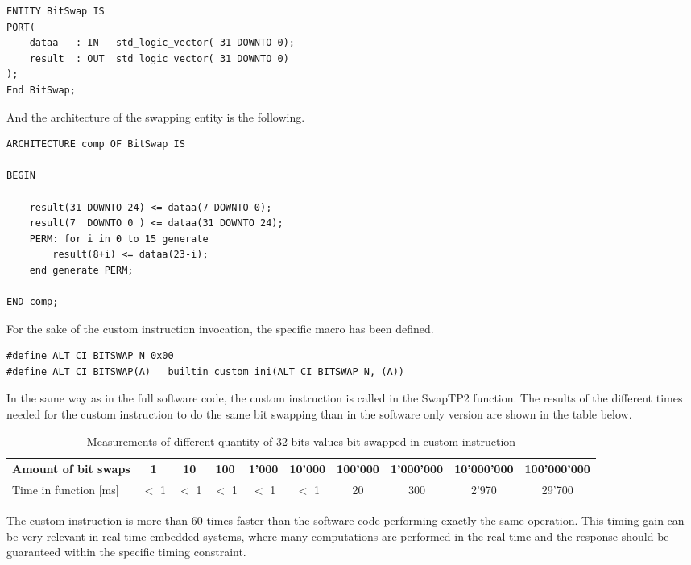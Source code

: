 \begin{verbatim}
ENTITY BitSwap IS
PORT(
    dataa	: IN   std_logic_vector( 31 DOWNTO 0);
    result	: OUT  std_logic_vector( 31 DOWNTO 0)    
);
End BitSwap;
\end{verbatim}

And the architecture of the swapping entity is the following.

\begin{verbatim}
ARCHITECTURE comp OF BitSwap IS

BEGIN

    result(31 DOWNTO 24) <= dataa(7 DOWNTO 0);
    result(7  DOWNTO 0 ) <= dataa(31 DOWNTO 24);
    PERM: for i in 0 to 15 generate
        result(8+i) <= dataa(23-i);  
    end generate PERM;
	
END comp;
\end{verbatim}
For the sake of the custom instruction invocation, the specific macro has been defined.
\begin{lstlisting}[style=customc, frame=none]
#define ALT_CI_BITSWAP_N 0x00
#define ALT_CI_BITSWAP(A) __builtin_custom_ini(ALT_CI_BITSWAP_N, (A))
\end{lstlisting}

In the same way as in the full software code, the custom instruction is called in the SwapTP2 function. 
The results of the different times needed for the custom instruction to do the same bit swapping than in the software only version are shown in the table below.

\begin{table}[h!]
\centering
\begin{tabular}{    |l|c|c|c|c|c|c|c|c|c|  }
\hline
 Amount of bit swaps & 1 & 10 & 100 & 1'000 & 10'000 & 100'000 & 1'000'000 & 10'000'000 & 100'000'000 \\
 \hline
 Time in function [ms]  & $<$ 1  & $<$ 1  & $<$ 1 & $<$ 1 & $<$ 1 & 20 & 300 & 2'970 & 29'700\\
 \hline
\end{tabular}
 \caption{Measurements of different quantity of 32-bits values bit swapped in custom instruction}
\label{table:customInstructionCodeMeasure}
\end{table}

The custom instruction is more than 60 times faster than the software code performing exactly the same operation. This timing gain can be very relevant in real time embedded systems, where many computations are performed in the real time and the response should be guaranteed within the specific timing constraint.

